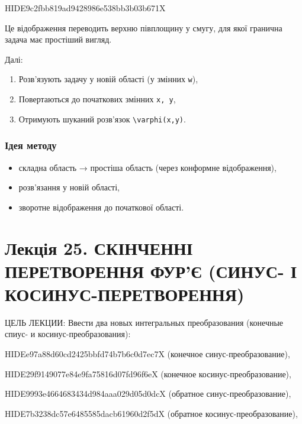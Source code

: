 \documentclass[
  ukrainian,
]{article}
\providecommand{\tightlist}{%
  \setlength{\itemsep}{0pt}\setlength{\parskip}{0pt}}
\begin{document}
HIDE9c2fbb819ad9428986e538bb3b03b671X

Це відображення переводить верхню півплощину у смугу, для якої гранична
задача має простіший вигляд.

Далі:

\begin{enumerate}
\def\labelenumi{\arabic{enumi}.}
\tightlist
\item
  Розв'язують задачу у новій області (у змінних \texttt{w}),
\item
  Повертаються до початкових змінних \texttt{x,\ y},
\item
  Отримують шуканий розв'язок \texttt{\textbackslash{}varphi(x,y)}.
\end{enumerate}

\subsubsection{Ідея
методу}\label{ux456ux434ux435ux44f-ux43cux435ux442ux43eux434ux443}

\begin{itemize}
\tightlist
\item
  складна область → простіша область (через конформне відображення),
\item
  розв'язання у новій області,
\item
  зворотне відображення до початкової області.
\end{itemize}

\section{Лекція 25. СКІНЧЕННІ ПЕРЕТВОРЕННЯ ФУР'Є (СИНУС- І
КОСИНУС-ПЕРЕТВОРЕННЯ)}\label{ux43bux435ux43aux446ux456ux44f-25.-ux441ux43aux456ux43dux447ux435ux43dux43dux456-ux43fux435ux440ux435ux442ux432ux43eux440ux435ux43dux43dux44f-ux444ux443ux440ux454-ux441ux438ux43dux443ux441--ux456-ux43aux43eux441ux438ux43dux443ux441-ux43fux435ux440ux435ux442ux432ux43eux440ux435ux43dux43dux44f}

ЦЕЛЬ ЛЕКЦИИ: Ввести два новых интегральных преобразования (конечные
спиус- и косинус-преобразования):

HIDEe97a88d60cd2425bbfd74b7b6c0d7ec7X (конечное синус-преобразование),

HIDE29f9149077e84e9fa75816d07fd96f6eX (конечное косинус-преобразование),

HIDE9993e4664683434d984aaa029d05d0dcX (обратное синус-преобразование),

HIDE7b3238dc57e6485585dacb61960d2f5dX (обратное косинус-преобразование),
\end{document}
